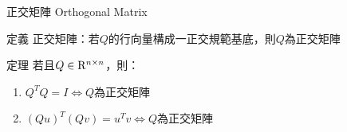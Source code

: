 \documentclass[14pt]{beamer}
\begin{document}
\begin{frame}{正交矩陣 Orthogonal Matrix}
	\begin{alertblock}{定義}
		正交矩陣：若$Q$的行向量構成一{\color{red}正交規範基底}，則$Q$為正交矩陣
	\end{alertblock}
	\begin{exampleblock}{定理}
		若且$Q\in {{\rm{R}}^{n\times n}}$，則：
		\begin{enumerate}
			\item ${{Q}^{T}}Q=I$$\Leftrightarrow$$Q$為正交矩陣 
			\item ${{(Qu)}^{T}}(Qv)={{u}^{T}}v$$\Leftrightarrow$$Q$為正交矩陣
		\end{enumerate}
	\end{exampleblock}
	
\end{frame}
\end{document}
